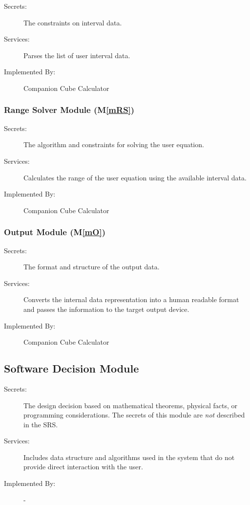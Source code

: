 \documentclass[12pt, titlepage]{article}
\newcommand{\mref}[1]{M\ref{#1}}
\newcommand{\progname}{Companion Cube Calculator} %
\begin{document}
\begin{description}
	\item[Secrets:]The constraints on interval data.
	\item[Services:]Parses the list of user interval data.
	\item[Implemented By:] \progname{}
\end{description}

\subsubsection{Range Solver Module (\mref{mRS})}

\begin{description}
	\item[Secrets:]The algorithm and constraints for solving the user equation.
	\item[Services:]Calculates the range of the user equation using the 
	available interval data.
	\item[Implemented By:] \progname{}
\end{description}

\subsubsection{Output Module (\mref{mO})}

\begin{description}
	\item[Secrets:]The format and structure of the output data.
	\item[Services:]Converts the internal data representation into a human 
	readable format and passes the information to the target output device.
	\item[Implemented By:] \progname{}
\end{description}


\subsection{Software Decision Module}

\begin{description}
\item[Secrets:] The design decision based on mathematical theorems, physical
  facts, or programming considerations. The secrets of this module are
  \emph{not} described in the SRS.
\item[Services:] Includes data structure and algorithms used in the system that
  do not provide direct interaction with the user. 
\item[Implemented By:] -
\end{description}
\end{document}
